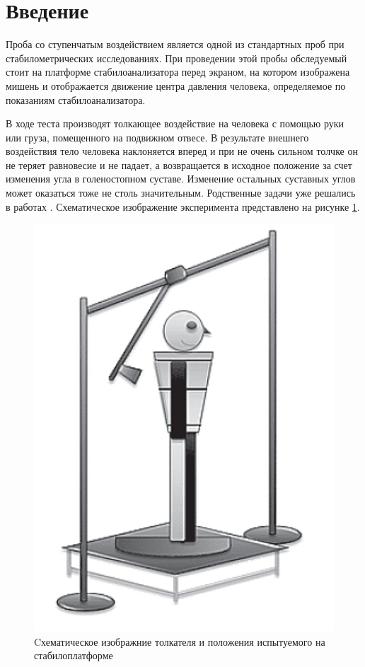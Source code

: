 \documentclass[a4paper,14pt]{article}
\theoremstyle{plain} %
\theoremstyle{definition} %
\theoremstyle{remark} %
\begin{document}
\thispagestyle{empty} %
\normalsize{
\newpage
\tableofcontents
\newpage

\section{Введение}
Проба со ступенчатым воздействием является одной из стандартных проб
при стабилометрических исследованиях. При проведении этой пробы
обследуемый стоит на платформе стабилоанализатора перед экраном, на
котором изображена мишень и отображается движение центра давления
человека, определяемое по показаниям стабилоанализатора.

В ходе теста производят толкающее воздействие на человека с помощью руки или
груза, помещенного на подвижном отвесе. В результате внешнего
воздействия тело человека наклоняется вперед и при не очень сильном толчке
он не теряет равновесие и не падает, а возвращается в исходное
положение за счет изменения угла в голеностопном суставе. Изменение
остальных суставных углов может оказаться тоже не столь значительным.
Родственные задачи уже решались в работах \cite{kasatkin}.
Схематическое изображение эксперимента представлено на рисунке \ref{fig:pusher}.
\begin{figure}[h!]
    \centering
    \includegraphics[]{human.png}
    \caption{Cхематическое изображние толкателя и
        положения испытуемого на стабилоплатформе}
    \label{fig:pusher}
\end{figure}

}
\end{document}
